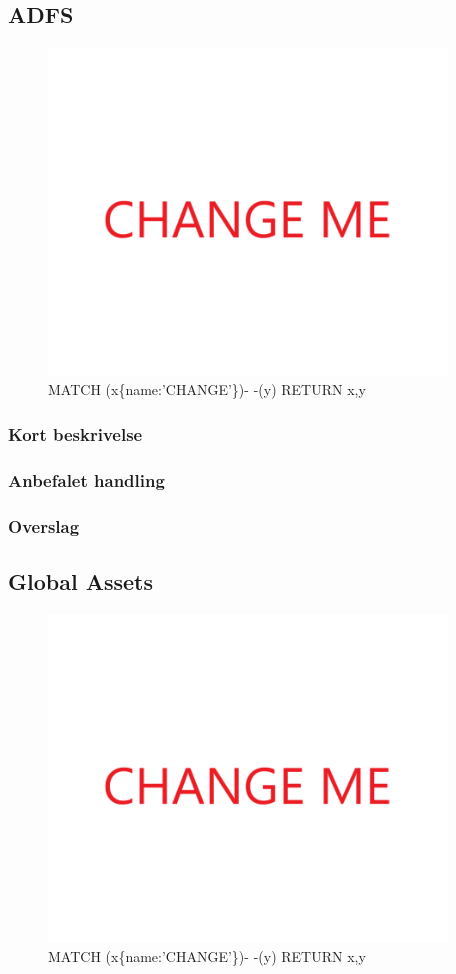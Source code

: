 \documentclass{article}
\begin{document}
\subsection{ADFS}
\begin{figure}[h]
\includegraphics[width=300pt]{CHANGE.PNG}
\caption{MATCH (x\{name:'CHANGE'\})- -(y) RETURN x,y}
\end{figure}
\subsubsection{Kort beskrivelse}
\subsubsection{Anbefalet handling}
\subsubsection{Overslag}


\subsection{Global Assets}
\begin{figure}[h]
\includegraphics[width=300pt]{CHANGE.PNG}
\caption{MATCH (x\{name:'CHANGE'\})- -(y) RETURN x,y}
\end{figure}
\end{document}
